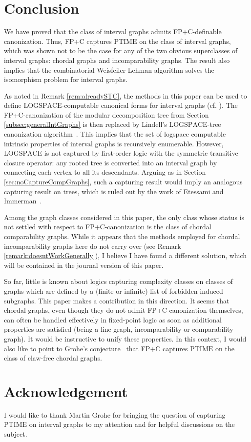 \documentclass[10pt]{article}
\theoremstyle{remark}
\theoremstyle{definition}
\theoremstyle{plain}
\newcommand{\logic}[1]{\textsf{\upshape\relsize{-0.5}#1}\xspace}
\newcommand{\FPC}{\logic{FP+C}}
\newcommand{\cclass}[1]{\ensuremath{\mathrm{#1}}\xspace}
\newcommand{\PTIME}{\cclass{PTIME}}
\newcommand{\LOGSPACE}{\cclass{LOGSPACE}}
\begin{document}
\section{Conclusion}

We have proved that the class of interval graphs admits \FPC-definable canonization. Thus, \FPC captures \PTIME on the class of interval graphs, which was shown not to be the case for any of the two obvious superclasses of interval graphs: chordal graphs and incomparability graphs. The result also implies that the combinatorial Weisfeiler-Lehman algorithm solves the isomorphism problem for interval graphs.


As noted in Remark \ref{rem:alreadySTC}, the methods in this paper can be used to define \LOGSPACE-computable canonical forms for interval graphs (cf. \cite{koebler10interval}). The \FPC-canonization of the modular decomposition tree from Section \ref{subsec:generalIntGraphs} is then replaced by Lindell's \LOGSPACE-tree canonization algorithm~\cite{lindell92logspace}. This implies that the set of logspace computable intrinsic properties of interval graphs is recursively enumerable. However, \LOGSPACE is not captured by first-order logic with the symmetric transitive closure operator: any rooted tree is converted into an interval graph by connecting each vertex to all its descendants. Arguing as in Section \ref{sec:noCaptureCompGraphs}, such a capturing result would imply an analogous capturing result on trees, which is ruled out by the work of Etessami and Immerman~\cite{etessami95tree}.


Among the graph classes considered in this paper, the only class whose status is not settled with respect to \FPC-canonization is the class of chordal comparability graphs. While it appears that the methods employed for chordal incomparability graphs here do not carry over (see Remark \ref{remark:doesntWorkGenerally}), I believe I have found a different solution, which will be contained in the journal version of this paper.

So far, little is known about logics capturing complexity classes on classes of graphs which are defined by a (finite or infinite) list of forbidden induced subgraphs. This paper makes a contribution in this direction. It seems that chordal graphs, even though they do not admit \FPC-canonization themselves, can often be handled effectively in fixed-point logic as soon as additional properties are satisfied (being a line graph, incomparability or comparability graph). It would be instructive to unify these properties. In this context, I would also like to point to Grohe's conjecture~\cite{grohe09fixed-point} that \FPC captures \PTIME on the class of claw-free chordal graphs.



\section*{Acknowledgement}
I would like to thank Martin Grohe for bringing the question of capturing \PTIME on interval graphs to my attention and for helpful discussions on the subject.




\end{document}
